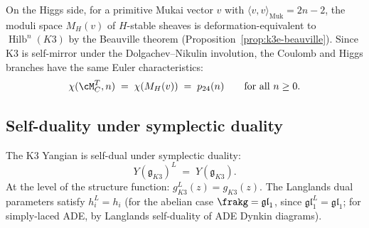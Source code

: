 On the Higgs side, for a primitive Mukai vector $v$ with $\langle v, v \rangle_{\mathrm{Muk}} = 2n-2$, the moduli space $M_H(v)$ of $H$-stable sheaves is deformation-equivalent to $\operatorname{Hilb}^n(K3)$ by the Beauville theorem (Proposition~\ref{prop:k3e-beauville}).  Since K3 is self-mirror under the Dolgachev--Nikulin involution, the Coulomb and Higgs branches have the same Euler characteristics:
\begin{equation}
\label{eq:k3e-ch-euler-match}
  \chi(\cM_C^T, n) \;=\; \chi(M_H(v)) \;=\; p_{24}(n)
  \qquad\text{for all } n \geq 0.
\end{equation}

\subsection{Self-duality under symplectic duality}
\label{subsec:k3e-symplectic-selfduality}

\begin{conjecture}
\label{conj:k3e-yangian-selfdual}
\ClaimStatusConjectured
The K3 Yangian is self-dual under symplectic duality:
\[
  Y(\mathfrak{g}_{K3})^L \;=\; Y(\mathfrak{g}_{K3}).
\]
At the level of the structure function: $g_{K3}^L(z) = g_{K3}(z)$.  The Langlands dual parameters satisfy $h_i^L = h_i$ (for the abelian case $\frakg = \mathfrak{gl}_1$, since $\mathfrak{gl}_1^L = \mathfrak{gl}_1$; for simply-laced ADE, by Langlands self-duality of ADE Dynkin diagrams).
\end{conjecture}

